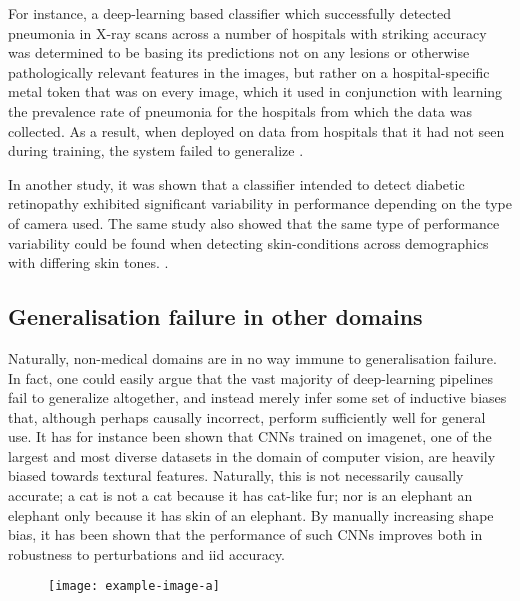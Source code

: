	For instance, a deep-learning based classifier which successfully detected pneumonia in X-ray scans across a number of hospitals with striking accuracy was determined to be basing its predictions not on any lesions or otherwise pathologically relevant features in the images, but rather on a hospital-specific metal token that was on every image, which it used in conjunction with learning the prevalence rate of pneumonia for the hospitals from which the data was collected. As a result, when deployed on data from hospitals that it had not seen during training, the system failed to generalize \cite{pneumonia}. 
		
	In another study, it was shown that a classifier intended to detect diabetic retinopathy exhibited significant variability in performance depending on the type of camera used. The same study also showed that the same type of performance variability could be found when detecting skin-conditions across demographics with differing skin tones. \cite{damour2020underspecification}. 
	 
	\subsection{Generalisation failure in other domains}
	Naturally, non-medical domains are in no way immune to generalisation failure. In fact, one could easily argue that the vast majority of deep-learning pipelines fail to generalize altogether, and instead merely infer some set of inductive biases that, although perhaps causally incorrect, perform sufficiently well for general use. It has for instance been shown that CNNs trained on imagenet, one of the largest and most diverse datasets in the domain of computer vision, are heavily biased towards textural features\cite{texturebias}. Naturally, this is not necessarily causally accurate; a cat is not a cat because it has cat-like fur; nor is an elephant an elephant only because it has skin of an elephant. By manually increasing shape bias, it has been shown that the performance of such CNNs improves both in robustness to perturbations and iid accuracy.

	\begin{figure}[H]
		\texttt{[image: example-image-a]}
		\caption{}
		\label{cat_elephant}
	\end{figure}
	

